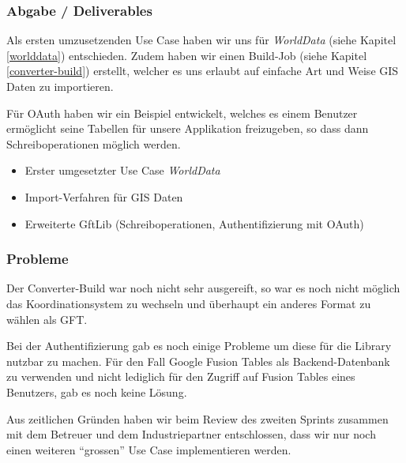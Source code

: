 \subsubsection{Abgabe / Deliverables}
Als ersten umzusetzenden Use Case haben wir uns für \emph{WorldData} (siehe Kapitel \ref{worlddata}) entschieden. Zudem haben wir einen Build-Job (siehe Kapitel \ref{converter-build}) erstellt, welcher es uns erlaubt auf einfache Art und Weise \gls{GIS} Daten zu importieren.

Für \gls{OAuth} haben wir ein Beispiel entwickelt, welches es einem Benutzer ermöglicht seine Tabellen für unsere Applikation freizugeben, so dass dann Schreiboperationen möglich werden.

\begin{itemize}
	\item Erster umgesetzter Use Case \emph{WorldData}
	\item Import-Verfahren für \gls{GIS} Daten
	\item Erweiterte GftLib (Schreiboperationen, Authentifizierung mit \gls{OAuth})
\end{itemize}

\subsubsection{Probleme}
Der Converter-Build war noch nicht sehr ausgereift, so war es noch nicht möglich das Koordinationsystem zu wechseln und überhaupt ein anderes Format zu wählen als GFT.

Bei der Authentifizierung gab es noch einige Probleme um diese für die Library nutzbar zu machen. Für den Fall Google Fusion Tables als Backend-Datenbank zu verwenden und nicht lediglich für den Zugriff auf Fusion Tables eines Benutzers, gab es noch keine Lösung.

Aus zeitlichen Gründen haben wir beim Review des zweiten Sprints zusammen mit dem Betreuer und dem Industriepartner entschlossen, dass wir nur noch einen weiteren "`grossen"' Use Case implementieren werden.